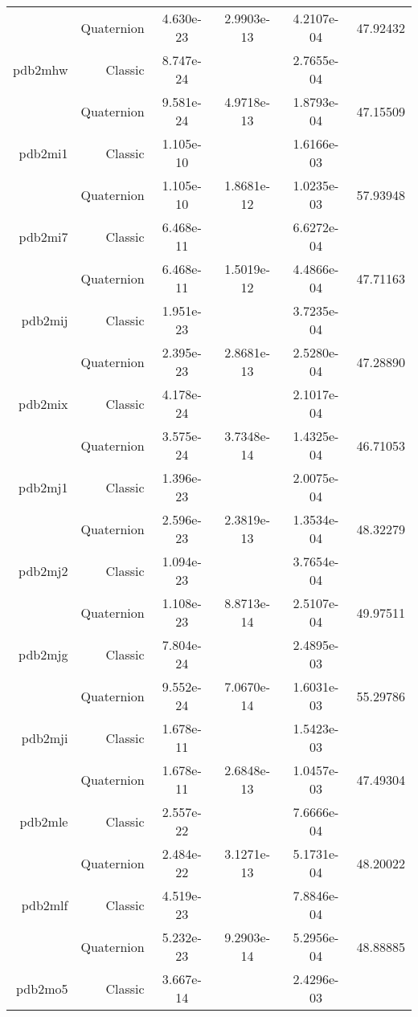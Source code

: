 \begin{xltabular}{\textwidth}{r|rS[table-format=1.3e+2]S[table-format=1.4e+2]S[table-format=1.4e+2]S[table-format=-1.5]}
& Quaternion & 4.630e-23 & 2.9903e-13 & 4.2107e-04 & 47.92432\\  \addlinespace
pdb2mhw & Classic & 8.747e-24 &  & 2.7655e-04 & \\
& Quaternion & 9.581e-24 & 4.9718e-13 & 1.8793e-04 & 47.15509\\  \addlinespace
pdb2mi1 & Classic & 1.105e-10 &  & 1.6166e-03 & \\
& Quaternion & 1.105e-10 & 1.8681e-12 & 1.0235e-03 & 57.93948\\  \addlinespace
pdb2mi7 & Classic & 6.468e-11 &  & 6.6272e-04 & \\
& Quaternion & 6.468e-11 & 1.5019e-12 & 4.4866e-04 & 47.71163\\  \addlinespace
pdb2mij & Classic & 1.951e-23 &  & 3.7235e-04 & \\
& Quaternion & 2.395e-23 & 2.8681e-13 & 2.5280e-04 & 47.28890\\  \addlinespace
pdb2mix & Classic & 4.178e-24 &  & 2.1017e-04 & \\
& Quaternion & 3.575e-24 & 3.7348e-14 & 1.4325e-04 & 46.71053\\  \addlinespace
pdb2mj1 & Classic & 1.396e-23 &  & 2.0075e-04 & \\
& Quaternion & 2.596e-23 & 2.3819e-13 & 1.3534e-04 & 48.32279\\  \addlinespace
pdb2mj2 & Classic & 1.094e-23 &  & 3.7654e-04 & \\
& Quaternion & 1.108e-23 & 8.8713e-14 & 2.5107e-04 & 49.97511\\  \addlinespace
pdb2mjg & Classic & 7.804e-24 &  & 2.4895e-03 & \\
& Quaternion & 9.552e-24 & 7.0670e-14 & 1.6031e-03 & 55.29786\\  \addlinespace
pdb2mji & Classic & 1.678e-11 &  & 1.5423e-03 & \\
& Quaternion & 1.678e-11 & 2.6848e-13 & 1.0457e-03 & 47.49304\\  \addlinespace
pdb2mle & Classic & 2.557e-22 &  & 7.6666e-04 & \\
& Quaternion & 2.484e-22 & 3.1271e-13 & 5.1731e-04 & 48.20022\\  \addlinespace
pdb2mlf & Classic & 4.519e-23 &  & 7.8846e-04 & \\
& Quaternion & 5.232e-23 & 9.2903e-14 & 5.2956e-04 & 48.88885\\  \addlinespace
pdb2mo5 & Classic & 3.667e-14 &  & 2.4296e-03 & \\

\end{xltabular}
